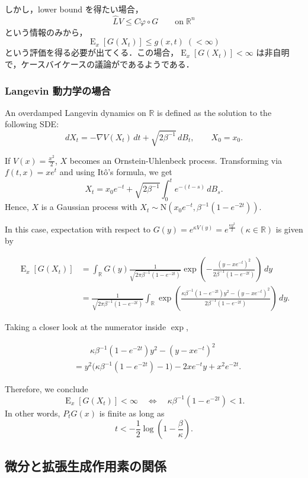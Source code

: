 \documentclass[
  11pt,
]{bxjsarticle}
\begin{document}
しかし，lower bound を得たい場合， \[
\widehat{L}V\le C\varphi\circ G\qquad\mathrm{on}\;\mathbb{R}^n
\] という情報のみから， \[
\operatorname{E}_x[G(X_t)]\le g(x,t)\;(<\infty)
\]
という評価を得る必要が出てくる．この場合，\(\operatorname{E}_x[G(X_t)]<\infty\)
は非自明で，ケースバイケースの議論がであるようである．

\subsubsection{Langevin
動力学の場合}\label{langevin-ux52d5ux529bux5b66ux306eux5834ux5408}

An overdamped Langevin dynamics on \(\mathbb{R}\) is defined as the
solution to the following SDE: \[
dX_t=-\nabla V(X_t)\,dt+\sqrt{2\beta^{-1}}\,dB_t,\qquad X_0=x_0.
\]

If \(V(x)=\frac{x^2}{2}\), \(X\) becomes an Ornstein-Uhlenbeck process.
Transforming via \(f(t,x)=xe^t\) and using Itô's formula, we get \[
X_t=x_0e^{-t}+\sqrt{2\beta^{-1}}\int^t_0e^{-(t-s)}\,dB_s.
\] Hence, \(X\) is a Gaussian process with
\(X_t\sim\mathrm{N}\left(x_0e^{-t},\beta^{-1}(1-e^{-2t})\right)\).

In this case, expectation with respect to
\(G(y)=e^{\kappa V(y)}=e^{\frac{\kappa y^2}{2}}\;(\kappa\in\mathbb{R})\)
is given by

\begin{align*}
    \operatorname{E}_x[G(X_t)]&=\int_{\mathbb{R}} G(y)\frac{1}{\sqrt{2\pi\beta^{-1}(1-e^{-2t})}}\exp\left(-\frac{(y-xe^{-t})^2}{2\beta^{-1}(1-e^{-2t})}\right)\,dy\\
    &=\frac{1}{\sqrt{2\pi\beta^{-1}(1-e^{-2t})}}\int_{\mathbb{R}}\exp\left(\frac{\kappa\beta^{-1}(1-e^{-2t})y^2-(y-xe^{-t})^2}{2\beta^{-1}(1-e^{-2t})}\right)\,dy.
\end{align*}

Taking a closer look at the numerator inside \(\exp\),

\begin{align*}
    &\qquad\kappa\beta^{-1}(1-e^{-2t})y^2-(y-xe^{-t})^2\\
    &=y^2\biggr(\kappa\beta^{-1}(1-e^{-2t})-1\biggl)-2xe^{-t}y+x^2e^{-2t}.
\end{align*}

Therefore, we conclude \[
\operatorname{E}_x[G(X_t)]<\infty\quad\Leftrightarrow\quad\kappa\beta^{-1}(1-e^{-2t})<1.
\] In other words, \(P_tG(x)\) is finite as long as \[
t<-\frac{1}{2}\log\left(1-\frac{\beta}{\kappa}\right).
\]

\subsection{微分と拡張生成作用素の関係}\label{ux5faeux5206ux3068ux62e1ux5f35ux751fux6210ux4f5cux7528ux7d20ux306eux95a2ux4fc2}
\end{document}
